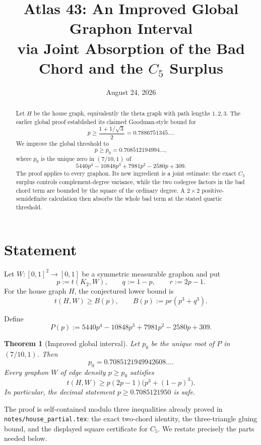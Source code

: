 \documentclass[11pt]{article}
\title{Atlas 43: An Improved Global Graphon Interval\\
via Joint Absorption of the Bad Chord and the $C_5$ Surplus}
\author{}
\date{August 24, 2026}
\newtheorem{theorem}{Theorem}
\theoremstyle{remark}
\begin{document}
\maketitle

\begin{abstract}
Let $H$ be the house graph, equivalently the theta graph with path
lengths $1,2,3$.  The earlier global proof established its claimed
Goodman-style bound for
\[
 p\geq \frac{1+1/\sqrt3}{2}=0.7886751345\ldots.
\]
We improve the global threshold to
\[
 p\geq p_0=0.708512194994\ldots,
\]
where $p_0$ is the unique zero in $(7/10,1)$ of
\[
 5440p^4-10848p^3+7981p^2-2580p+309.
\]
The proof applies to every graphon.  Its new ingredient is a joint estimate:
the exact $C_5$ surplus controls complement-degree variance, while the
two codegree factors in the bad chord term are bounded by the square of the
ordinary degree.  A $2\times2$ positive-semidefinite calculation then
absorbs the whole bad term at the stated quartic threshold.
\end{abstract}

\section{Statement}

Let $W\colon[0,1]^2\to[0,1]$ be a symmetric measurable graphon and put
\[
 p:=t(K_2,W),\qquad q:=1-p,\qquad r:=2p-1.
\]
For the house graph $H$, the conjectured lower bound is
\begin{equation}\label{eq:target}
 t(H,W)\geq B(p),
 \qquad
 B(p):=pr(p^3+q^3).
\end{equation}

Define
\begin{equation}\label{eq:quartic}
 P(p):=5440p^4-10848p^3+7981p^2-2580p+309.
\end{equation}

\begin{theorem}[Improved global interval]\label{thm:main}
Let $p_0$ be the unique root of $P$ in $(7/10,1)$.  Then
\[
 p_0=0.7085121949942608\ldots.
\]
Every graphon $W$ of edge density $p\geq p_0$ satisfies
\[
 \boxed{
 t(H,W)\geq p(2p-1)\bigl(p^3+(1-p)^3\bigr).
 }
\]
In particular, the decimal statement $p\geq0.7085121950$ is safe.
\end{theorem}

The proof is self-contained modulo three inequalities already proved in
\texttt{notes/house\_partial.tex}: the exact two-chord identity, the
three-triangle gluing bound, and the displayed square certificate for
$C_5$.  We restate precisely the parts needed below.
\end{document}
